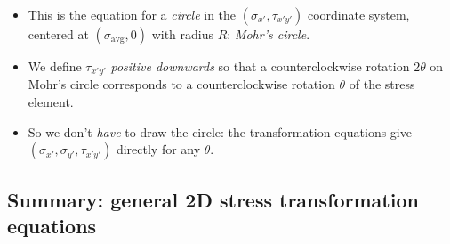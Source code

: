 \documentclass[11pt]{article}
\begin{document}
\begin{itemize}
  \item This is the equation for a \emph{circle} in the $(\sigma_{x'}, \tau_{x'y'})$
        coordinate system, centered at $(\sigma_{\text{avg}}, 0)$ with radius $R$:
        \emph{Mohr's circle}.
  \item We define $\tau_{x'y'}$ \emph{positive downwards} so that a counterclockwise
        rotation $2\theta$ on Mohr's circle corresponds to a counterclockwise rotation
        $\theta$ of the stress element.
  \item So we don't \emph{have} to draw the circle: the transformation equations give
        $(\sigma_{x'}, \sigma_{y'}, \tau_{x'y'})$ directly for any $\theta$.
\end{itemize}

\subsection*{Summary: general 2D stress transformation equations}

\begin{center}
\end{center}
\end{document}
